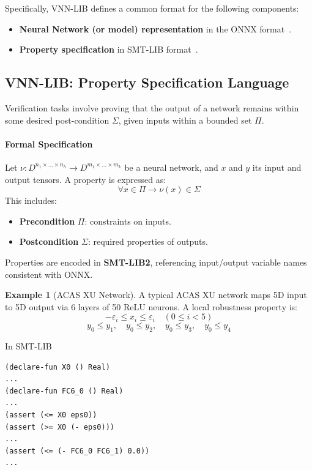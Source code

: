 \documentclass[oneside,11pt,dvipsnames]{book}
\numberwithin{equation}{section}
\theoremstyle{definition}
\newtheorem{example}{Example}[section]
\theoremstyle{remark}
\newcommand{\tvn}[1]{\iftoggle{usecomment}{{\color{red}{[TVN]: #1}}}{}}
\newcommand{\hd}[1]{\iftoggle{usecomment}{{\color{blue}{[HD]: #1}}}{}}
\begin{document}
Specifically, VNN-LIB defines a common format for the following components:
\begin{itemize}
    \item \textbf{Neural Network (or model) representation} in the ONNX format~\cite{onnx}.
    \item \textbf{Property specification} in SMT-LIB format~\cite{barrett2010smt}.
\end{itemize}



\subsection{VNN-LIB: Property Specification Language}

Verification tasks involve proving that the output of a network remains within some desired post-condition $\Sigma$, given inputs within a bounded set $\Pi$.

\paragraph{Formal Specification}
Let $\nu: D^{n_1 \times \dots \times n_h} \to D^{m_1 \times \dots \times m_k}$ be a neural network, and $x$ and $y$ its input and output tensors. A property is expressed as:
\[
\forall x \in \Pi \rightarrow \nu(x) \in \Sigma
\]
This includes:
\begin{itemize}
    \item \textbf{Precondition} $\Pi$: constraints on inputs.
    \item \textbf{Postcondition} $\Sigma$: required properties of outputs.
\end{itemize}

Properties are encoded in \textbf{SMT-LIB2}, referencing input/output variable names consistent with ONNX.


\begin{example}[ACAS XU Network]

A typical ACAS XU network maps 5D input to 5D output via 6 layers of 50 ReLU neurons. A local robustness property is:
\[
-\varepsilon_i \leq x_i \leq \varepsilon_i \quad (0 \leq i < 5)
\]
\[
y_0 \leq y_1, \quad y_0 \leq y_2, \quad y_0 \leq y_3, \quad y_0 \leq y_4
\]

In SMT-LIB\tvn{is this also the VNN-LIB code? If not, add the VNN-LIB code}\hd{not VNNLIB}
\begin{lstlisting}[basicstyle=\ttfamily\scriptsize]
(declare-fun X0 () Real)
...
(declare-fun FC6_0 () Real)
...
(assert (<= X0 eps0))
(assert (>= X0 (- eps0)))
...
(assert (<= (- FC6_0 FC6_1) 0.0))
...
\end{lstlisting}
\end{example}
\end{document}
